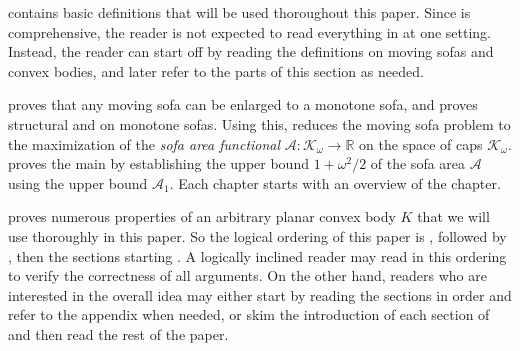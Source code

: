 contains basic definitions that will be used thoroughout this paper. Since  is comprehensive, the reader is not expected to read everything in  at one setting. Instead, the reader can start off by reading the definitions on moving sofas and convex bodies, and later refer to the parts of this section as needed.

 proves  that any moving sofa can be enlarged to a monotone sofa, and proves structural  and  on monotone sofas. Using this,  reduces the moving sofa problem to the maximization of the \emph{sofa area functional} \(\mathcal{A} : \mathcal{K}_\omega \to \mathbb{R}\) on the space of caps \(\mathcal{K}_\omega\).  proves the main  by establishing the upper bound \(1 + \omega^2/2\) of the sofa area \(\mathcal{A}\) using the upper bound \(\mathcal{A}_1\). Each chapter starts with an overview of the chapter.

 proves numerous properties of an arbitrary planar convex body \(K\) that we will use thoroughly in this paper. So the logical ordering of this paper is , followed by , then the sections starting . A logically inclined reader may read in this ordering to verify the correctness of all arguments. On the other hand, readers who are interested in the overall idea may either start by reading the sections in order and refer to the appendix when needed, or skim the introduction of each section of  and then read the rest of the paper.